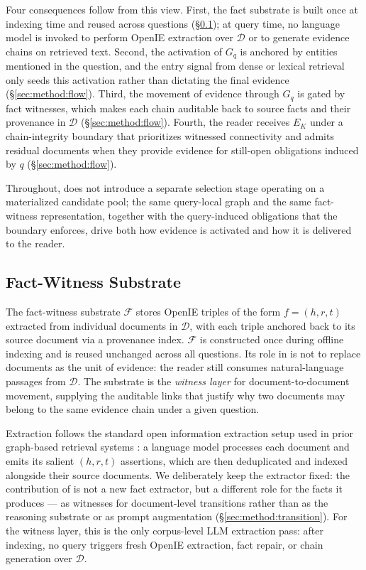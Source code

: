 Four consequences follow from this view. First, the fact substrate is
built once at indexing time and reused across questions
(\S\ref{sec:method:substrate}); at query time, no language model is invoked
to perform OpenIE extraction over $\mathcal{D}$ or to generate evidence
chains on retrieved text. Second, the activation of $G_q$ is anchored by
entities mentioned in the question, and the entry signal from dense or
lexical retrieval only seeds this activation rather than dictating the
final evidence (\S\ref{sec:method:flow}). Third, the movement of evidence
through $G_q$ is gated by fact witnesses, which makes each chain auditable
back to source facts and their provenance in $\mathcal{D}$
(\S\ref{sec:method:flow}). Fourth, the reader receives $E_K$ under a
chain-integrity boundary that prioritizes witnessed connectivity and admits
residual documents when they provide evidence for still-open obligations
induced by $q$ (\S\ref{sec:method:flow}).

Throughout, \methodname{} does not introduce a separate selection stage
operating on a materialized candidate pool; the same query-local graph and
the same fact-witness representation, together with the query-induced
obligations that the boundary enforces, drive both how evidence is activated
and how it is delivered to the reader.

\subsection{Fact-Witness Substrate}
\label{sec:method:substrate}

The fact-witness substrate $\mathcal{F}$ stores OpenIE triples of the form
$f = (h, r, t)$ extracted from individual documents in $\mathcal{D}$, with
each triple anchored back to its source document via a provenance index.
$\mathcal{F}$ is constructed once during offline indexing and is reused
unchanged across all questions. Its role in \methodname{} is not to replace
documents as the unit of evidence: the reader still consumes natural-language
passages from $\mathcal{D}$. The substrate is the \emph{witness layer} for
document-to-document movement, supplying the auditable links that justify
why two documents may belong to the same evidence chain under a given
question.

Extraction follows the standard open information extraction setup used in
prior graph-based retrieval systems
\citep{angeli2015leveraging,gutierrez2025hipporag}: a language model
processes each document and emits its salient $(h, r, t)$ assertions, which
are then deduplicated and indexed alongside their source documents. We
deliberately keep the extractor fixed: the contribution of \methodname{} is
not a new fact extractor, but a different role for the facts it produces
--- as witnesses for document-level transitions rather than as the
reasoning substrate or as prompt augmentation (\S\ref{sec:method:transition}).
For the witness layer, this is the only corpus-level LLM extraction pass:
after indexing, no query triggers fresh OpenIE extraction, fact repair, or
chain generation over $\mathcal{D}$.

